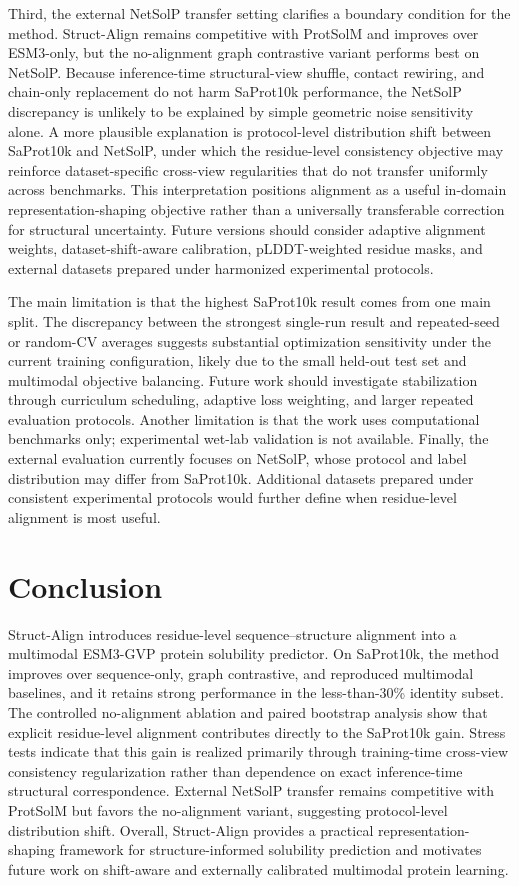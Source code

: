 \documentclass[conference]{IEEEtran}
\begin{document}
Third, the external NetSolP transfer setting clarifies a boundary condition for the method. Struct-Align remains competitive with ProtSolM and improves over ESM3-only, but the no-alignment graph contrastive variant performs best on NetSolP. Because inference-time structural-view shuffle, contact rewiring, and chain-only replacement do not harm SaProt10k performance, the NetSolP discrepancy is unlikely to be explained by simple geometric noise sensitivity alone. A more plausible explanation is protocol-level distribution shift between SaProt10k and NetSolP, under which the residue-level consistency objective may reinforce dataset-specific cross-view regularities that do not transfer uniformly across benchmarks. This interpretation positions alignment as a useful in-domain representation-shaping objective rather than a universally transferable correction for structural uncertainty. Future versions should consider adaptive alignment weights, dataset-shift-aware calibration, pLDDT-weighted residue masks, and external datasets prepared under harmonized experimental protocols.

The main limitation is that the highest SaProt10k result comes from one main split. The discrepancy between the strongest single-run result and repeated-seed or random-CV averages suggests substantial optimization sensitivity under the current training configuration, likely due to the small held-out test set and multimodal objective balancing. Future work should investigate stabilization through curriculum scheduling, adaptive loss weighting, and larger repeated evaluation protocols. Another limitation is that the work uses computational benchmarks only; experimental wet-lab validation is not available. Finally, the external evaluation currently focuses on NetSolP, whose protocol and label distribution may differ from SaProt10k. Additional datasets prepared under consistent experimental protocols would further define when residue-level alignment is most useful.

\section{Conclusion}
Struct-Align introduces residue-level sequence--structure alignment into a multimodal ESM3-GVP protein solubility predictor. On SaProt10k, the method improves over sequence-only, graph contrastive, and reproduced multimodal baselines, and it retains strong performance in the less-than-30\% identity subset. The controlled no-alignment ablation and paired bootstrap analysis show that explicit residue-level alignment contributes directly to the SaProt10k gain. Stress tests indicate that this gain is realized primarily through training-time cross-view consistency regularization rather than dependence on exact inference-time structural correspondence. External NetSolP transfer remains competitive with ProtSolM but favors the no-alignment variant, suggesting protocol-level distribution shift. Overall, Struct-Align provides a practical representation-shaping framework for structure-informed solubility prediction and motivates future work on shift-aware and externally calibrated multimodal protein learning.
\end{document}
